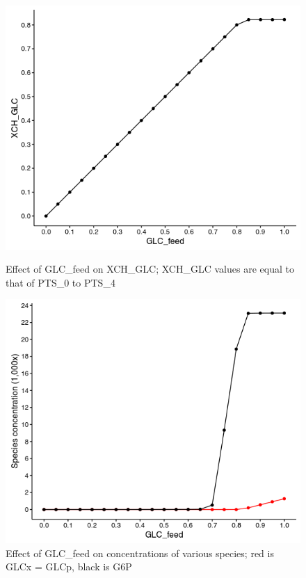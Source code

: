 \documentclass[parskip=full, numbers=noenddot]{scrreprt}
\begin{document}
\begin{figure}[h]
  \centering
  \includegraphics[scale=0.5]{growthglc_XCHGLCvGLCfeed}
  \caption{Effect of GLC\_feed on XCH\_GLC; XCH\_GLC values are equal to that of PTS\_0 to PTS\_4}
  \label{fig:growthglc_XCHGLCvGLCfeed}

  \includegraphics[scale=0.5]{growthglc_species}
  \caption{Effect of GLC\_feed on concentrations of various species; red is GLCx = GLCp, black is G6P}
  \label{fig:growthglc_species}
\end{figure}
\end{document}
